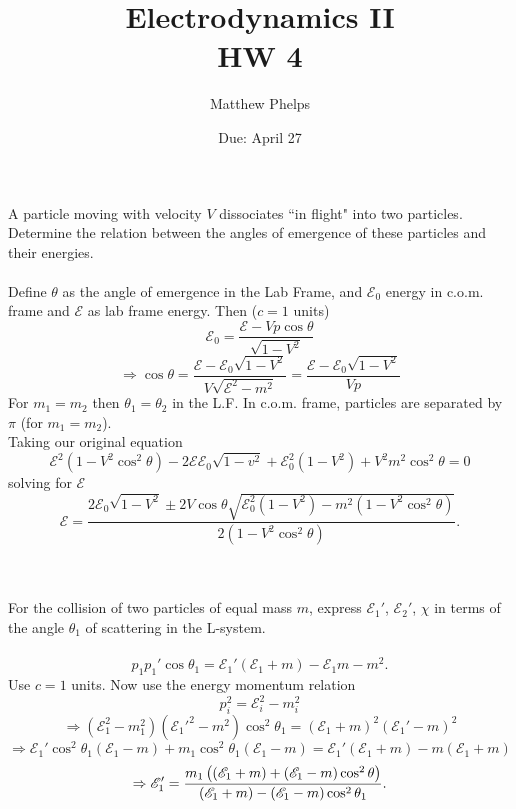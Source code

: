 \documentclass[10pt,letterpaper]{article}
\title{Electrodynamics II\\HW 4}
\author{Matthew Phelps}
\date{Due: April 27}
\begin{document}
\maketitle

\benum

\item
A particle moving with velocity $V$ dissociates ``in flight" into two particles. Determine the relation between the angles of emergence of these particles and their energies.
\\ \\
Define $\theta$ as the angle of emergence in the Lab Frame, and $\mathscr E_0$ energy in c.o.m. frame and 
$\mathscr E$ as lab frame energy. Then ($c=1$ units)
\[
	\mathscr E_0 = \frac{\mathscr E-Vp\cos\theta}{\sqrt{1-V^2}}
\]
\[
	\Rightarrow \cos\theta = \frac{\mathscr E - \mathscr E_0\sqrt{1-V^2}}{V\sqrt{\mathscr E^2-m^2}}
	= \frac{\mathscr E - \mathscr E_0\sqrt{1-V^2}}{Vp}
\]
For $m_1 = m_2$ then $\theta_1=\theta_2$ in the L.F. In c.o.m. frame, particles are separated by $\pi$ (for $m_1 = m_2$).
\\
Taking our original equation
\[
	\mathscr E^2(1-V^2\cos^2\theta)-2\mathscr E\mathscr E_0 \sqrt{1-v^2}+\mathscr E_0^2(1-V^2)+V^2m^2
	\cos^2\theta = 0
\]
solving for $\mathscr E$
\[
	\mathscr E = \frac{2\mathscr E_0 \sqrt{1-V^2}\pm 2V\cos\theta \sqrt{\mathscr E_0^2(1-V^2)-m^2(1-V^2
	\cos^2\theta)}}{2(1-V^2\cos^2\theta)}.
\]
\\ \\
\item
For the collision of two particles of equal mass $m$, express $\mathscr{E}_1'$, $\mathscr{E_2'}$, $\chi$ in terms
of the angle $\theta_1$ of scattering in the L-system.
\\ \\
\[
	p_1p_1'\cos\theta_1 = \mathscr E_1'(\mathscr E_1+m)-\mathscr E_1m-m^2.
\]
Use $c=1$ units. Now use the energy momentum relation
\[
	p_i^2 = \mathscr E_i^2-m_i^2
\]
\[
	\Rightarrow (\mathscr E_1^2-m_1^2)(\mathscr E_1'^2 - m^2)\cos^2\theta_1 = 
	(\mathscr E_1+m)^2(\mathscr E_1'-m)^2
\]
\[
	\Rightarrow \mathscr E_1'\cos^2\theta_1(\mathscr E_1-m)+m_1\cos^2\theta_1(\mathscr E_1-m)
	= \mathscr E_1'(\mathscr E_1+m)-m(\mathscr E_1+m)
\]
\[
	\Rightarrow \mathscr E_1' = \frac{m_1\left( (\mathscr E_1+m)+(\mathscr E_1-m)\cos^2\theta\right)}{(\mathscr E_1
	+m)-(\mathscr E_1-m)\cos^2\theta_1}.
\]
\\ \\
\end{document}
